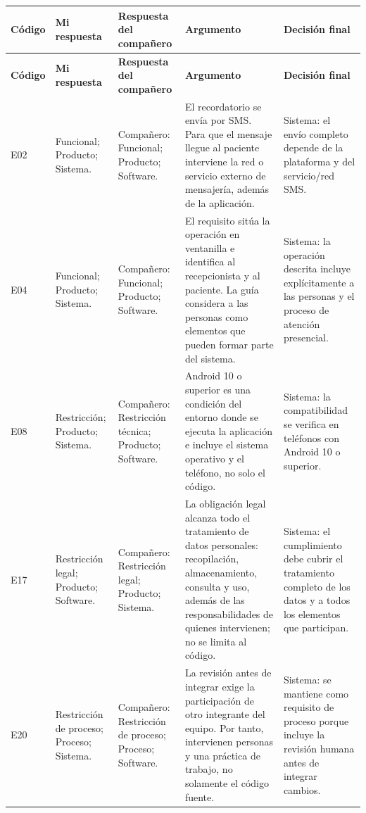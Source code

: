 \documentclass[10pt,letterpaper,landscape]{article}
\begin{document}
\begingroup\footnotesize\setlength{\tabcolsep}{3pt}\renewcommand{\arraystretch}{1.15}
\begin{longtable}{>{\raggedright\arraybackslash}p{1.3cm}>{\raggedright\arraybackslash}p{4cm}>{\raggedright\arraybackslash}p{4cm}>{\raggedright\arraybackslash}p{8cm}>{\raggedright\arraybackslash}p{5.3cm}}
\rowcolor{hdr}\textbf{Código} & \textbf{Mi respuesta} & \textbf{Respuesta del compañero} & \textbf{Argumento} & \textbf{Decisión final} \\ \hline
\endfirsthead
\rowcolor{hdr}\textbf{Código} & \textbf{Mi respuesta} & \textbf{Respuesta del compañero} & \textbf{Argumento} & \textbf{Decisión final} \\ \hline
\endhead
E02 & Funcional; Producto; Sistema. & Compañero: Funcional; Producto; Software. & El recordatorio se envía por SMS. Para que el mensaje llegue al paciente interviene la red o servicio externo de mensajería, además de la aplicación. & Sistema: el envío completo depende de la plataforma y del servicio/red SMS. \\ \hline
E04 & Funcional; Producto; Sistema. & Compañero: Funcional; Producto; Software. & El requisito sitúa la operación en ventanilla e identifica al recepcionista y al paciente. La guía considera a las personas como elementos que pueden formar parte del sistema. & Sistema: la operación descrita incluye explícitamente a las personas y el proceso de atención presencial. \\ \hline
E08 & Restricción; Producto; Sistema. & Compañero: Restricción técnica; Producto; Software. & Android 10 o superior es una condición del entorno donde se ejecuta la aplicación e incluye el sistema operativo y el teléfono, no solo el código. & Sistema: la compatibilidad se verifica en teléfonos con Android 10 o superior. \\ \hline
E17 & Restricción legal; Producto; Software. & Compañero: Restricción legal; Producto; Sistema. & La obligación legal alcanza todo el tratamiento de datos personales: recopilación, almacenamiento, consulta y uso, además de las responsabilidades de quienes intervienen; no se limita al código. & Sistema: el cumplimiento debe cubrir el tratamiento completo de los datos y a todos los elementos que participan. \\ \hline
E20 & Restricción de proceso; Proceso; Sistema. & Compañero: Restricción de proceso; Proceso; Software. & La revisión antes de integrar exige la participación de otro integrante del equipo. Por tanto, intervienen personas y una práctica de trabajo, no solamente el código fuente. & Sistema: se mantiene como requisito de proceso porque incluye la revisión humana antes de integrar cambios. \\ \hline
\end{longtable}
\endgroup
\end{document}
